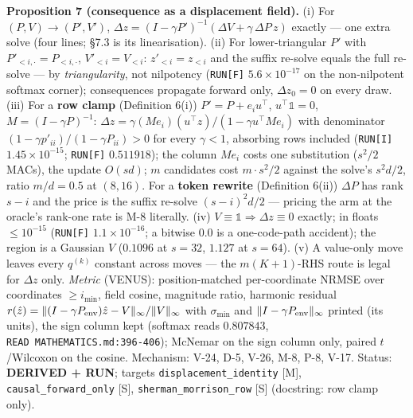 \documentclass[11pt,a4paper]{article}
\theoremstyle{plain}
\theoremstyle{definition}
\theoremstyle{remark}
\begin{document}
\textbf{Proposition 7 (consequence as a displacement field).} (i) For
\((P,V)\to(P',V')\),
\(\Delta z=(I-\gamma P')^{-1}(\Delta V+\gamma\,\Delta P\,z)\) exactly
--- one extra solve (four lines; \citep{bottou-2013-counterfactual} §7.3
is its linearisation). (ii) For lower-triangular \(P'\) with
\(P'_{<i,\cdot}=P_{<i,\cdot}\), \(V'_{<i}=V_{<i}\): \(z'_{<i}=z_{<i}\)
and the suffix re-solve equals the full re-solve --- by
\emph{triangularity}, not nilpotency (\texttt{RUN{[}F{]}}
\(5.6\times10^{-17}\) on the non-nilpotent softmax corner); consequences
propagate forward only, \(\Delta z_0=0\) on every draw. (iii) For a
\textbf{row clamp} (Definition 6(i)) \(P'=P+e_iu^\top\),
\(u^\top\mathbb 1=0\), \(M=(I-\gamma P)^{-1}\):
\(\Delta z=\gamma(Me_i)(u^\top z)/(1-\gamma u^\top Me_i)\) with
denominator \((1-\gamma p'_{ii})/(1-\gamma P_{ii})>0\) for every
\(\gamma<1\), absorbing rows included (\texttt{RUN{[}I{]}}
\(1.45\times10^{-15}\); \texttt{RUN{[}F{]}} \(0.511918\)); the column
\(Me_i\) costs one substitution (\(s^2/2\) MACs), the update \(O(sd)\);
\(m\) candidates cost \(m\cdot s^2/2\) against the solve's \(s^2d/2\),
ratio \(m/d=0.5\) at \((8,16)\). For a \textbf{token rewrite}
(Definition 6(ii)) \(\Delta P\) has rank \(s-i\) and the price is the
suffix re-solve \((s-i)^2d/2\) --- pricing the arm at the oracle's
rank-one rate is M-8 literally. (iv)
\(V\equiv\mathbb 1\Rightarrow\Delta z\equiv0\) exactly; in floats
\(\le10^{-15}\) (\texttt{RUN{[}F{]}} \(1.1\times10^{-16}\); a bitwise
\(0.0\) is a one-code-path accident); the region is a Gaussian \(V\)
(\(0.1096\) at \(s=32\), \(1.127\) at \(s=64\)). (v) A value-only move
leaves every \(q^{(k)}\) constant across moves --- the \(m(K+1)\)-RHS
route is legal for \(\Delta z\) only. \emph{Metric} (VENUS):
position-matched per-coordinate NRMSE over coordinates \(\ge i_{\min}\),
field cosine, magnitude ratio, harmonic residual
\(r(\hat z)=\|(I-\gamma P_{\rm env})\hat z-V\|_\infty/\|V\|_\infty\)
with \(\sigma_{\min}\) and \(\|I-\gamma P_{\rm env}\|_\infty\) printed
(its units), the sign column kept (softmax reads \(0.807843\),
\texttt{READ\ MATHEMATICS.md:396-406}); McNemar on the sign column only,
paired \(t\)/Wilcoxon on the cosine. Mechanism: V-24, D-5, V-26, M-8,
P-8, V-17. Status: \textbf{DERIVED + RUN}; targets
\texttt{displacement\_identity} {[}M{]}, \texttt{causal\_forward\_only}
{[}S{]}, \texttt{sherman\_morrison\_row} {[}S{]} (docstring: row clamp
only).
\end{document}
